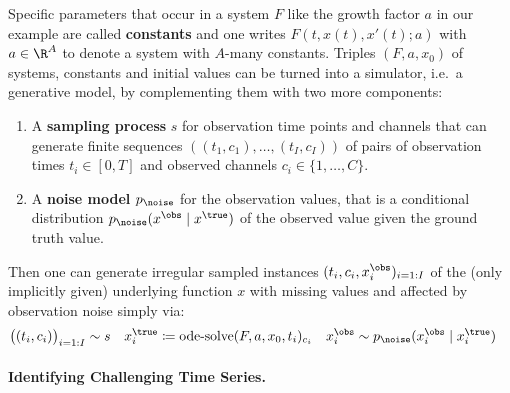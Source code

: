 Specific parameters that occur in a system $F$ like the growth factor $a$
in our example are called \textbf{constants} and one writes $F(t, x(t), x'(t); a)$
with $a\in\R^A$ to denote a system with $A$-many constants.
Triples $(F, a, x_0)$ of systems, constants and initial values can be turned into a simulator,
i.e.\ a generative model, by complementing them with two more components:
%
\begin{enumerate}
\item A \textbf{sampling process} $s$ for observation time points and channels that
	can generate finite sequences $((t_1, c_1), \ldots, (t_I, c_I))$ of
	pairs of observation times $t_i\in[0,T]$ and observed channels $c_i\in\{1,\ldots,C\}$.
\item A \textbf{noise model} $p_\noise$ for the observation values, that is a conditional
	distribution ${p_\noise(x^\obs \mid x^\true)}$ of the observed value
	given the ground truth value.
\end{enumerate}
%
Then one can generate irregular sampled instances $(t_i, c_i, x^\obs_i)_{i=1{:}I}$
of the (only implicitly given) underlying function $x$ with missing values
and affected by observation noise simply via:
%
\begin{align}\label{eq:sampling}
		\bigl((t_i, c_i)\bigr)_{i=1:I} &\sim s
	&	x_i^\true  &\coloneqq \text{ode-solve}(F, a, x_0, t_i)_{c_i}
	&	x_i^\obs   &\sim p_\noise(x^\obs_i \mid x^\true_i)
\end{align}
%
%

\paragraph{Identifying Challenging Time Series.}\label{sec:mean-gradient-deviation}

